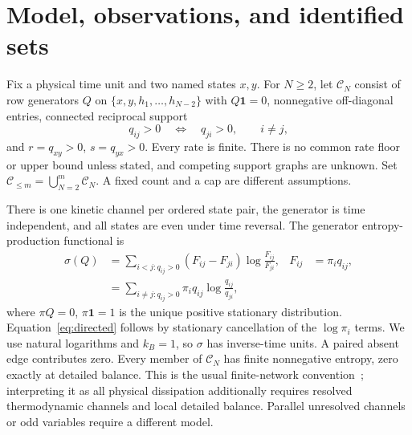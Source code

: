 \documentclass[aps,pre,onecolumn,11pt,longbibliography,notitlepage]{revtex4-2}
\newcommand{\1}{\mathbf 1}
\newcommand{\C}{\mathcal C}
\newcommand{\sig}{\sigma}
\begin{document}


\section{Model, observations, and identified sets}\label{sec:model}
Fix a physical time unit and two named states $x,y$. For $N\ge2$, let $\C_N$ consist of row generators $Q$ on $\{x,y,h_1,\ldots,h_{N-2}\}$ with $Q\1=0$, nonnegative off-diagonal entries, connected reciprocal support
\begin{equation}
 q_{ij}>0\quad\Longleftrightarrow\quad q_{ji}>0,\qquad i\ne j,
\end{equation}
and $r=q_{xy}>0$, $s=q_{yx}>0$. Every rate is finite. There is no common rate floor or upper bound unless stated, and competing support graphs are unknown. Set $\C_{\le m}=\bigcup_{N=2}^m\C_N$. A fixed count and a cap are different assumptions.

There is one kinetic channel per ordered state pair, the generator is time independent, and all states are even under time reversal. The generator entropy-production functional is
\begin{align}
 \sig(Q)&=\sum_{i<j:q_{ij}>0}(F_{ij}-F_{ji})\log\frac{F_{ij}}{F_{ji}},
 &F_{ij}&=\pi_iq_{ij},\label{eq:entropy}\\
 &=\sum_{i\ne j:q_{ij}>0}\pi_iq_{ij}\log\frac{q_{ij}}{q_{ji}},\label{eq:directed}
\end{align}
where $\pi Q=0$, $\pi\1=1$ is the unique positive stationary distribution. Equation~\eqref{eq:directed} follows by stationary cancellation of the $\log\pi_i$ terms. We use natural logarithms and $k_B=1$, so $\sig$ has inverse-time units. A paired absent edge contributes zero. Every member of $\C_N$ has finite nonnegative entropy, zero exactly at detailed balance. This is the usual finite-network convention~\cite{Schnakenberg1976,NishiyamaHasegawa2023}; interpreting it as all physical dissipation additionally requires resolved thermodynamic channels and local detailed balance. Parallel unresolved channels or odd variables require a different model.
\end{document}
